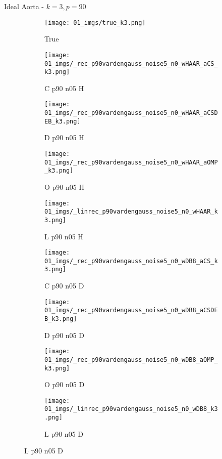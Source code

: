 \begin{frame}{Ideal Aorta - $k=3,p=90$}{}
\begin{figure}
\begin{subfigure}{0.1\textwidth}
\texttt{[image: 01\_imgs/true\_k3.png]}
\caption*{\Tiny True}
\end{subfigure}
\begin{subfigure}{0.1\textwidth}
\texttt{[image: 01\_imgs/\_rec\_p90vardengauss\_noise5\_n0\_wHAAR\_aCS\_k3.png]}
\caption*{\Tiny C p90 n05 H}
\end{subfigure}
\begin{subfigure}{0.1\textwidth}
\texttt{[image: 01\_imgs/\_rec\_p90vardengauss\_noise5\_n0\_wHAAR\_aCSDEB\_k3.png]}
\caption*{\Tiny D p90 n05 H}
\end{subfigure}
\begin{subfigure}{0.1\textwidth}
\texttt{[image: 01\_imgs/\_rec\_p90vardengauss\_noise5\_n0\_wHAAR\_aOMP\_k3.png]}
\caption*{\Tiny O p90 n05 H}
\end{subfigure}
\begin{subfigure}{0.1\textwidth}
\texttt{[image: 01\_imgs/\_linrec\_p90vardengauss\_noise5\_n0\_wHAAR\_k3.png]}
\caption*{\Tiny L p90 n05 H}
\end{subfigure}
\begin{subfigure}{0.1\textwidth}
\texttt{[image: 01\_imgs/\_rec\_p90vardengauss\_noise5\_n0\_wDB8\_aCS\_k3.png]}
\caption*{\Tiny C p90 n05 D}
\end{subfigure}
\begin{subfigure}{0.1\textwidth}
\texttt{[image: 01\_imgs/\_rec\_p90vardengauss\_noise5\_n0\_wDB8\_aCSDEB\_k3.png]}
\caption*{\Tiny D p90 n05 D}
\end{subfigure}
\begin{subfigure}{0.1\textwidth}
\texttt{[image: 01\_imgs/\_rec\_p90vardengauss\_noise5\_n0\_wDB8\_aOMP\_k3.png]}
\caption*{\Tiny O p90 n05 D}
\end{subfigure}
\begin{subfigure}{0.1\textwidth}
\texttt{[image: 01\_imgs/\_linrec\_p90vardengauss\_noise5\_n0\_wDB8\_k3.png]}
\caption*{\Tiny L p90 n05 D}
\end{subfigure}

\vspace{5pt}


\end{figure}
\end{frame}
